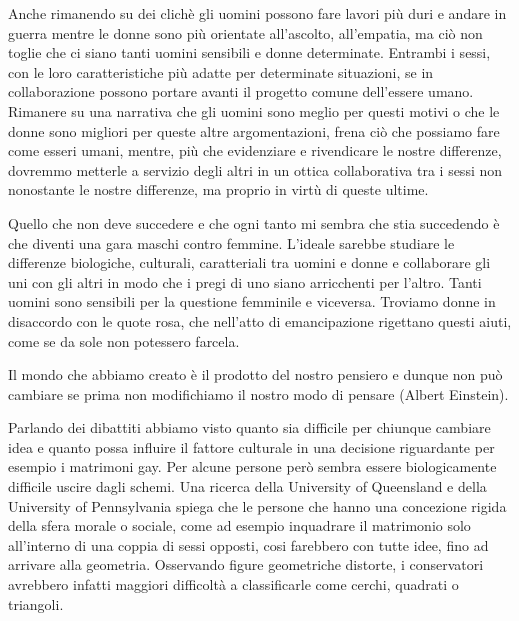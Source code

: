 \documentclass[12pt]{book} %
\begin{document}
\begin{mdframed}[linewidth=1pt]
\bigskip

Anche rimanendo su dei clichè gli uomini possono fare lavori più duri e andare in guerra mentre le donne sono più
orientate all'ascolto, all'empatia, ma ciò non toglie che ci siano tanti
uomini sensibili e donne determinate. Entrambi i sessi, con le loro caratteristiche più adatte per determinate
situazioni, se in collaborazione possono portare avanti il progetto comune dell'essere umano.
Rimanere su una narrativa che gli uomini sono meglio per questi motivi o che le donne sono migliori per queste altre
argomentazioni, frena ciò che possiamo fare come esseri umani, mentre, più che evidenziare e rivendicare le nostre
differenze, dovremmo metterle a servizio degli altri in un ottica collaborativa tra i sessi non nonostante le nostre
differenze, ma proprio in virtù di queste ultime. 

Quello che non deve succedere e che ogni tanto mi sembra che stia succedendo è che diventi una gara maschi contro
femmine. L'ideale sarebbe studiare le differenze biologiche, culturali, caratteriali tra uomini e
donne e collaborare gli uni con gli altri in modo che i pregi di uno siano arricchenti per
l'altro. Tanti uomini sono sensibili per la questione femminile e viceversa. Troviamo donne in
disaccordo con le quote rosa, che nell'atto di emancipazione rigettano questi aiuti, come se da
sole non potessero farcela.
\end{mdframed}

\bigskip

Il mondo che abbiamo creato è il prodotto del nostro pensiero e dunque non può cambiare se prima non modifichiamo il
nostro modo di pensare (Albert Einstein).


\bigskip

Parlando dei dibattiti abbiamo visto quanto sia difficile per chiunque cambiare idea e quanto possa influire il fattore
culturale in una decisione riguardante per esempio i matrimoni gay. Per alcune persone però sembra essere
biologicamente difficile uscire dagli schemi. Una ricerca della University of Queensland e della University of
Pennsylvania spiega
che le persone che hanno una concezione rigida della sfera morale o sociale, come ad esempio inquadrare il matrimonio
solo all'interno di una coppia di sessi opposti, cosi farebbero con tutte idee, fino ad arrivare alla geometria.
Osservando figure geometriche distorte, i conservatori avrebbero infatti maggiori difficoltà a classificarle come
cerchi, quadrati o triangoli.
\end{document}
